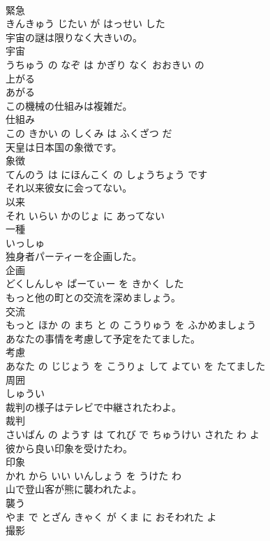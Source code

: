 \documentclass[8pt]{extreport}
\begin{document}
\begin{CJK}{UTF8}{min}
\\	緊急 
\\	きんきゅう じたい が はっせい した		
\\	宇宙の謎は限りなく大きいの。	
\\	宇宙 
\\	うちゅう の なぞ は かぎり なく おおきい の		
\\	上がる	
\\	あがる		
\\	この機械の仕組みは複雑だ。	
\\	仕組み 
\\	この きかい の しくみ は ふくざつ だ		
\\	天皇は日本国の象徴です。	
\\	象徴 
\\	てんのう は にほんこく の しょうちょう です		
\\	それ以来彼女に会ってない。	
\\	以来 
\\	それ いらい かのじょ に あってない		
\\	一種	
\\	いっしゅ		
\\	独身者パーティーを企画した。	
\\	企画 
\\	どくしんしゃ ぱーてぃー を きかく した		
\\	もっと他の町との交流を深めましょう。	
\\	交流 
\\	もっと ほか の まち と の こうりゅう を ふかめましょう		
\\	あなたの事情を考慮して予定をたてました。	
\\	考慮 
\\	あなた の じじょう を こうりょ して よてい を たてました		
\\	周囲	
\\	しゅうい		
\\	裁判の様子はテレビで中継されたわよ。	
\\	裁判 
\\	さいばん の ようす は てれび で ちゅうけい された わ よ		
\\	彼から良い印象を受けたわ。	
\\	印象 
\\	かれ から いい いんしょう を うけた わ		
\\	山で登山客が熊に襲われたよ。	
\\	襲う 
\\	やま で とざん きゃく が くま に おそわれた よ		
\\	撮影	

\end{CJK}
\end{document}
